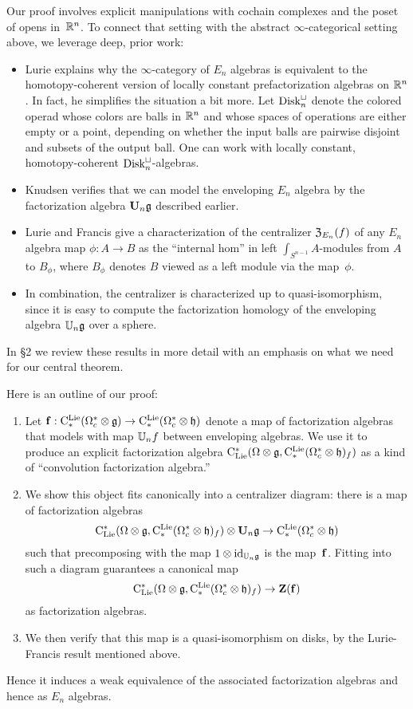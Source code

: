 \documentclass[11pt]{amsart}
\numberwithin{equation}{section}
\begin{document}
Our proof involves explicit manipulations with cochain complexes and the poset of opens in~$\mathbb R^n$.
To connect that setting with the abstract $\infty$-categorical setting above,
we leverage deep, prior work:
\begin{itemize}
\item Lurie \cite{LurieHA} explains why the $\infty$-category of $E_n$ algebras is equivalent to the homotopy-coherent version of locally constant prefactorization algebras on $\mathbb R^n$.  
In fact, he simplifies the situation a bit more. 
Let ${\rm Disk}_n^\sqcup$ denote the colored operad whose colors are balls in $\mathbb R^n$ and whose spaces of operations are either empty or a point, depending on whether the input balls are pairwise disjoint and subsets of the output ball. 
One can work with locally constant, homotopy-coherent ${\rm Disk}_n^\sqcup$-algebras.
\item Knudsen verifies that we can model the enveloping $E_n$ algebra by the factorization algebra $\mathbf U_n \mathfrak g$ described earlier.
\item Lurie and Francis give a characterization of the centralizer ${\frak Z}_{E_n}(f)$ of any $E_n$ algebra map $\phi: A \to B$ as the ``internal hom'' in left $\int_{S^{n-1}}A$-modules from $A$ to $B_\phi$, where $B_\phi$ denotes $B$ viewed as a left module via the map~$\phi$.
\item In combination, the centralizer is characterized up to quasi-isomorphism, 
since it is easy to compute the factorization homology of the enveloping algebra $\mathbb U_n \mathfrak g$ over a sphere.
\end{itemize}
In \S2 we review these results in more detail with an emphasis on what we need for our central theorem.

Here is an outline of our proof:
\begin{enumerate}
\item Let ${\bf f}: {\rm C}^{\rm Lie}_*(\Omega_c^* \otimes \mathfrak g) \to {\rm C}^{\rm Lie}_*(\Omega_c^* \otimes \mathfrak h)$ denote a map of factorization algebras that models with map $\mathbb U_n f$ between enveloping algebras. 
We use it to produce an explicit factorization algebra ${\rm C}_{\rm Lie}^*(\Omega \otimes \mathfrak g, {\rm C}^{\rm Lie}_*(\Omega_c^* \otimes \mathfrak h)_f)$ as a kind of ``convolution factorization algebra.'' 
\item We show this object fits canonically into a centralizer diagram: there is a map of factorization algebras
\[
{\rm C}_{\rm Lie}^*(\Omega \otimes \mathfrak g, {\rm C}^{\rm Lie}_*(\Omega_c^* \otimes \mathfrak h)_f) \otimes \mathbf U_n \mathfrak g \to {\rm C}^{\rm Lie}_*(\Omega_c^* \otimes \mathfrak h)
\]
such that precomposing with the map $1 \otimes {\rm id}_{\mathbb U_n \mathfrak g}$ is the map~${\bf f}$.
Fitting into such a diagram guarantees a canonical map 
\[
{\rm C}_{\rm Lie}^*(\Omega \otimes \mathfrak g, {\rm C}^{\rm Lie}_*(\Omega_c^* \otimes \mathfrak h)_f) \to \mathbf Z({\bf f})
\]
as factorization algebras. 
\item We then verify that this map is a quasi-isomorphism on disks, by the Lurie-Francis result mentioned above. 
\end{enumerate}
Hence it induces a weak equivalence of the associated factorization algebras and hence as $E_n$ algebras. 
\end{document}

